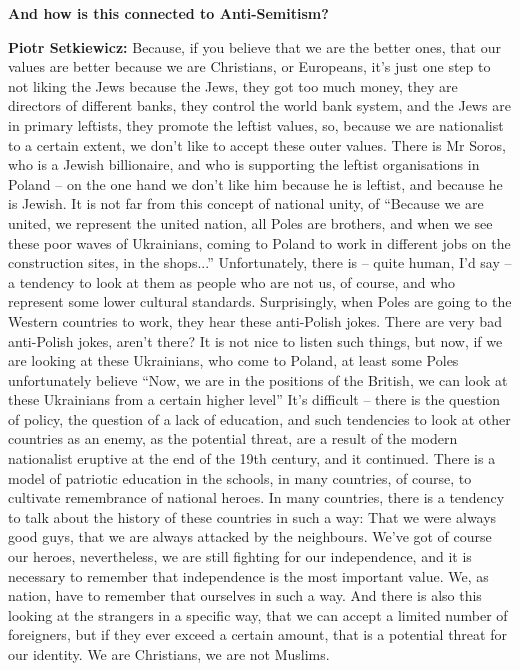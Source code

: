 \textbf{And how is this connected to Anti-Semitism?} 

\textbf{Piotr Setkiewicz:} Because, if you believe that we are the better ones, that our values are better because we are Christians, or Europeans, it’s just one step to not liking the Jews because the Jews, they got too much money, they are directors of different banks, they control the world bank system, and the Jews are in primary leftists, they promote the leftist values, so, because we are nationalist to a certain extent, we don’t like to accept these outer values. There is Mr Soros, who is a Jewish billionaire, and who is supporting the leftist organisations in Poland – on the one hand we don’t like him because he is leftist, and because he is Jewish. It is not far from this concept of national unity, of ``Because we are united, we represent the united nation, all Poles are brothers, and when we see these poor waves of Ukrainians, coming to Poland to work in different jobs on the construction sites, in the shops...'' Unfortunately, there is – quite human, I’d say – a tendency to look at them as people who are not us, of course, and who represent some lower cultural standards. Surprisingly, when Poles are going to the Western countries to work, they hear these anti-Polish jokes. There are very bad anti-Polish jokes, aren’t there? It is not nice to listen such things, but now, if we are looking at these Ukrainians, who come to Poland, at least some Poles unfortunately believe ``Now, we are in the positions of the British, we can look at these Ukrainians from a certain higher level'' It’s difficult – there is the question of policy, the question of a lack of education, and such tendencies to look at other countries as an enemy, as the potential threat, are a result of the modern nationalist eruptive at the end of the 19th century, and it continued. There is a model of patriotic education in the schools, in many countries, of course, to cultivate remembrance of national heroes. In many countries, there is a tendency to talk about the history of these countries in such a way: That we were always good guys, that we are always attacked by the neighbours. We’ve got of course our heroes, nevertheless, we are still fighting for our independence, and it is necessary to remember that independence is the most important value. We, as nation, have to remember that ourselves in such a way. And there is also this looking at the strangers in a specific way, that we can accept a limited number of foreigners, but if they ever exceed a certain amount, that is a potential threat for our identity. We are Christians, we are not Muslims.
